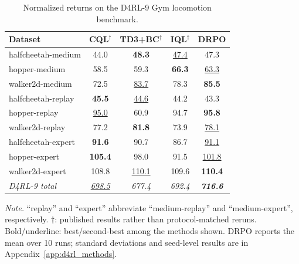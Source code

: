 \documentclass[sigconf,anonymous,review]{acmart}
\theoremstyle{acmdefinition}
\begin{document}
\begin{table}[t]
\centering
\caption{Normalized returns on the D4RL-9 Gym locomotion benchmark.}
\label{tab:d4rl_performance}

\small
\setlength{\tabcolsep}{3.9pt}
\renewcommand{\arraystretch}{1.07}

\begin{tabular*}{\columnwidth}{@{\extracolsep{\fill}}lcccc}
\toprule
Dataset
&
CQL$^\dagger$
&
TD3+BC$^\dagger$
&
IQL$^\dagger$
&
\textbf{DRPO}
\\
\midrule

halfcheetah-medium
& 44.0 & \textbf{48.3} & \underline{47.4} & 47.3 \\
hopper-medium
& 58.5 & 59.3 & \textbf{66.3} & \underline{63.3} \\
walker2d-medium
& 72.5 & \underline{83.7} & 78.3 & \textbf{85.5} \\

\midrule

halfcheetah-replay
& \textbf{45.5} & \underline{44.6} & 44.2 & 43.3 \\
hopper-replay
& \underline{95.0} & 60.9 & 94.7 & \textbf{95.8} \\
walker2d-replay
& 77.2 & \textbf{81.8} & 73.9 & \underline{78.1} \\

\midrule

halfcheetah-expert
& \textbf{91.6} & 90.7 & 86.7 & \underline{91.1} \\
hopper-expert
& \textbf{105.4} & 98.0 & 91.5 & \underline{101.8} \\
walker2d-expert
& 108.8 & \underline{110.1} & 109.6 & \textbf{110.4} \\

\midrule

\textit{D4RL-9 total}
& \textit{\underline{698.5}}
& \textit{677.4}
& \textit{692.4}
& \textbf{\textit{716.6}}
\\

\bottomrule
\end{tabular*}

\vspace{2pt}

\begin{minipage}{\columnwidth}
\small
\textit{Note.} ``replay'' and ``expert'' abbreviate ``medium-replay'' and
``medium-expert'', respectively. $\dagger$: published results rather than
protocol-matched reruns. Bold/underline: best/second-best among the methods
shown. DRPO reports the mean over 10 runs; standard deviations and seed-level
results are in Appendix~\ref{app:d4rl_methods}.
\end{minipage}

\end{table}
\end{document}
